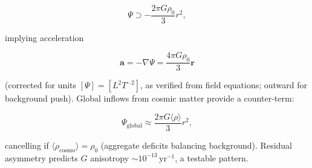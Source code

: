 \[
\Psi \supset -\frac{2\pi G \rho_0}{3} r^2,
\]

implying acceleration

\begin{equation}
\mathbf{a} = -\nabla \Psi = \frac{4\pi G \rho_0}{3} \mathbf{r}
\end{equation}

(corrected for units $[\Psi] = [L^2 T^{-2}]$, as verified from field equations; outward for background push). Global inflows from cosmic matter provide a counter-term:

\begin{equation}
\Psi_{\text{global}} \approx \frac{2\pi G \langle \rho \rangle}{3} r^2,
\end{equation}

cancelling if $\langle \rho_\text{cosmo} \rangle = \rho_0$ (aggregate deficits balancing background). Residual asymmetry predicts $G$ anisotropy $\sim 10^{-13} \, \mathrm{yr}^{-1}$, a testable pattern.

\medskip
\noindent
{}
